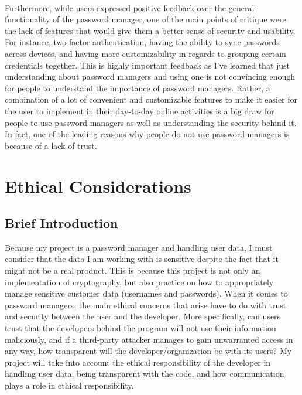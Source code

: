 \documentclass[10pt,twocolumn]{article}
\begin{document}
\paragraph{}
Furthermore, while users expressed positive feedback over the general functionality of the password manager, one of the main points of critique were the lack of features that would give them a better sense of security and usability. For instance, two-factor authentication, having the ability to sync passwords across devices, and having more customizability in regards to grouping certain credentials together. This is highly important feedback as I've learned that just understanding about password managers and using one is not convincing enough for people to understand the importance of password managers. Rather, a combination of a lot of convenient and customizable features to make it easier for the user to implement in their day-to-day online activities is a big draw for people to use password managers as well as understanding the security behind it. In fact, one of the leading reasons why people do not use password managers is because of a lack of trust\cite{Yee_Editor_2022}.

\section{Ethical Considerations}
\subsection{Brief Introduction}
Because my project is a password manager and handling user data, I must consider that the data I am working with is sensitive despite the fact that it might not be a real product. This is because this project is not only an implementation of cryptography, but also practice on how to appropriately manage sensitive customer data (usernames and passwords). When it comes to password managers, the main ethical concerns that arise have to do with trust and security between the user and the developer. More specifically, can users trust that the developers behind the program will not use their information maliciously, and if a third-party attacker manages to gain unwarranted access in any way, how transparent will the developer/organization be with its users? My project will take into account the ethical responsibility of the developer in handling user data, being transparent with the code, and how communication plays a role in ethical responsibility.
\end{document}
